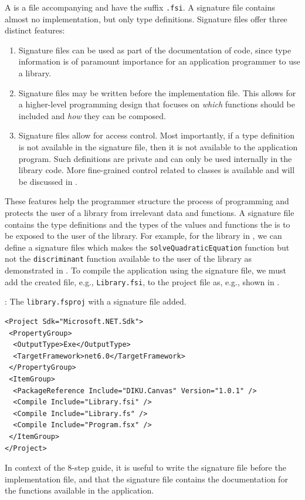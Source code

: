 \documentclass[fsharpNotes.tex]{subfiles}
\begin{document}
A  is a file accompanying  and have the suffix \lstinline[language=console]{.fsi}. A signature file contains almost no implementation, but only type definitions. Signature files offer three distinct features:
\begin{enumerate}
\item Signature files can be used as part of the documentation of code, since type information is of paramount importance for an application programmer to use a library. 
\item Signature files may be written before the implementation file. This allows for a higher-level programming design that focuses on \emph{which} functions should be included and \emph{how} they can be composed.
\item Signature files allow for access control. Most importantly, if a type definition is not available in the signature file, then it is not available to the application program. Such definitions are private and can only be used internally in the library code. More fine-grained control related to classes is available and will be discussed in .
\end{enumerate}
These features help the programmer structure the process of programming and protects the user of a library from irrelevant data and functions. A signature file contains the type definitions and the types of the values and functions the is to be exposed to the user of the library. For example, for the library in , we can define a signature files which makes the \lstinline{solveQuadraticEquation} function but not the \lstinline{discriminant} function available to the user of the library as demonstrated in .
To compile the application using the signature file, we must add the created file, e.g., \lstinline[language=console]{Library.fsi}, to the project file as, e.g., shown in .
\begin{codeNOutput}[label=libraryFsprojFSI,
  top=-5pt,
  bottom=-5pt,
  left=-2pt,
  right=-2pt,
]{: The \texttt{library.fsproj} with a signature file added.}
  \begin{lstlisting}[language=console,escapechar=§]
<Project Sdk="Microsoft.NET.Sdk">
 <PropertyGroup>
  <OutputType>Exe</OutputType>
  <TargetFramework>net6.0</TargetFramework>
 </PropertyGroup>
 <ItemGroup>
  <PackageReference Include="DIKU.Canvas" Version="1.0.1" />
  <Compile Include="Library.fsi" />
  <Compile Include="Library.fs" />
  <Compile Include="Program.fsx" />
 </ItemGroup>
</Project>
\end{lstlisting}
\end{codeNOutput}
In context of the 8-step guide, it is useful to write the signature file before the implementation file, and that the signature file contains the documentation for the functions available in the application.
\end{document}
